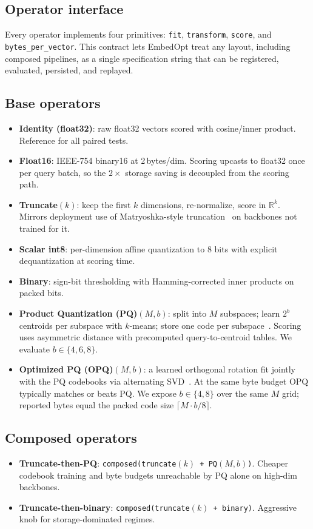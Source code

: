 \documentclass[sigconf]{acmart}
\newcommand{\method}{EmbedOpt}
\begin{document}
\subsection{Operator interface}
Every operator implements four primitives: \texttt{fit}, \texttt{transform}, \texttt{score}, and \texttt{bytes\_per\_vector}. This contract lets \method{} treat any layout, including composed pipelines, as a single specification string that can be registered, evaluated, persisted, and replayed.

\subsection{Base operators}
\begin{itemize}
  \item \textbf{Identity (float32)}: raw float32 vectors scored with cosine/inner product. Reference for all paired tests.
  \item \textbf{Float16}: IEEE-754 binary16 at 2\,bytes/dim. Scoring upcasts to float32 once per query batch, so the $2\times$ storage saving is decoupled from the scoring path.
  \item \textbf{Truncate}$(k)$: keep the first $k$ dimensions, re-normalize, score in $\mathbb{R}^{k}$. Mirrors deployment use of Matryoshka-style truncation~\cite{kusupati2022matryoshka} on backbones not trained for it.
  \item \textbf{Scalar int8}: per-dimension affine quantization to 8 bits with explicit dequantization at scoring time.
  \item \textbf{Binary}: sign-bit thresholding with Hamming-corrected inner products on packed bits.
  \item \textbf{Product Quantization (PQ)}$(M,b)$: split into $M$ subspaces; learn $2^b$ centroids per subspace with $k$-means; store one code per subspace~\cite{jegou2011product}. Scoring uses asymmetric distance with precomputed query-to-centroid tables. We evaluate $b \in \{4, 6, 8\}$.
  \item \textbf{Optimized PQ (OPQ)}$(M,b)$: a learned orthogonal rotation fit jointly with the PQ codebooks via alternating SVD~\cite{ge2014opq}. At the same byte budget OPQ typically matches or beats PQ. We expose $b \in \{4, 8\}$ over the same $M$ grid; reported bytes equal the packed code size $\lceil M \cdot b / 8 \rceil$.
\end{itemize}

\subsection{Composed operators}
\begin{itemize}
  \item \textbf{Truncate-then-PQ}: \texttt{composed(truncate$(k)$ + PQ$(M,b)$)}. Cheaper codebook training and byte budgets unreachable by PQ alone on high-dim backbones.
  \item \textbf{Truncate-then-binary}: \texttt{composed(truncate$(k)$ + binary)}. Aggressive knob for storage-dominated regimes.
\end{itemize}
\end{document}
